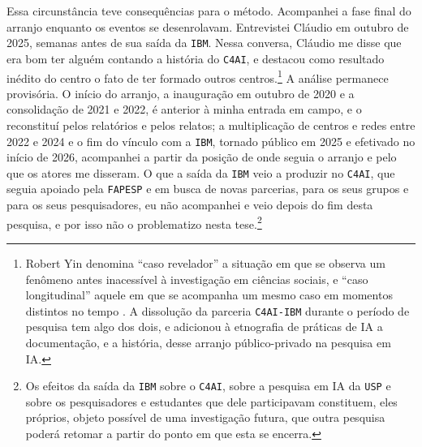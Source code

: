 Essa circunstância teve consequências para o método. Acompanhei a fase final do arranjo enquanto os eventos se desenrolavam. Entrevistei Cláudio em outubro de 2025, semanas antes de sua saída da \texttt{IBM}. Nessa conversa, Cláudio me disse que era bom ter alguém contando a história do \texttt{C4AI}, e destacou como resultado inédito do centro o fato de ter formado outros centros.\footnote{Robert Yin denomina \enquote{caso revelador} a situação em que se observa um fenômeno antes inacessível à investigação em ciências sociais, e \enquote{caso longitudinal} aquele em que se acompanha um mesmo caso em momentos distintos no tempo \parencite[p.~51]{Yin2018Case}. A dissolução da parceria \texttt{C4AI-IBM} durante o período de pesquisa tem algo dos dois, e adicionou à etnografia de práticas de IA a documentação, e a história, desse arranjo público-privado na pesquisa em IA.} A análise permanece provisória. O início do arranjo, a inauguração em outubro de 2020 e a consolidação de 2021 e 2022, é anterior à minha entrada em campo, e o reconstituí pelos relatórios e pelos relatos; a multiplicação de centros e redes entre 2022 e 2024 e o fim do vínculo com a \texttt{IBM}, tornado público em 2025 e efetivado no início de 2026, acompanhei a partir da posição de onde seguia o arranjo e pelo que os atores me disseram. O que a saída da \texttt{IBM} veio a produzir no \texttt{C4AI}, que seguia apoiado pela \texttt{FAPESP} e em busca de novas parcerias, para os seus grupos e para os seus pesquisadores, eu não acompanhei e veio depois do fim desta pesquisa, e por isso não o problematizo nesta tese.\footnote{Os efeitos da saída da \texttt{IBM} sobre o \texttt{C4AI}, sobre a pesquisa em IA da \texttt{USP} e sobre os pesquisadores e estudantes que dele participavam constituem, eles próprios, objeto possível de uma investigação futura, que outra pesquisa poderá retomar a partir do ponto em que esta se encerra.}

